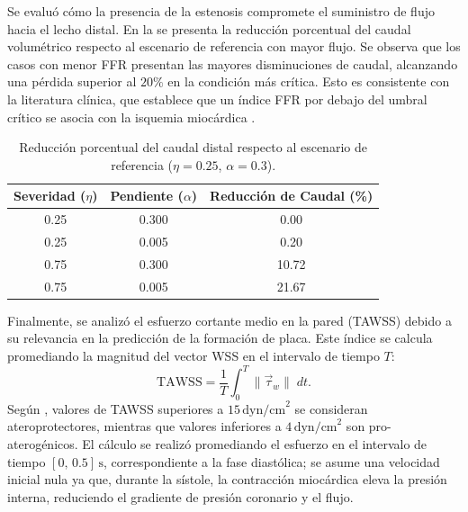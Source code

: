 \documentclass[12pt, letterpaper]{article}
\begin{document}
Se evaluó cómo la presencia de la estenosis compromete el suministro de flujo hacia el lecho distal. En la  se presenta la reducción porcentual del caudal volumétrico respecto al escenario de referencia con mayor flujo. Se observa que los casos con menor FFR presentan las mayores disminuciones de caudal, alcanzando una pérdida superior al $20\%$ en la condición más crítica. Esto es consistente con la literatura clínica, que establece que un índice FFR por debajo del umbral crítico se asocia con la isquemia miocárdica \cite{manual_ffr08}.

\begin{table}[htbp]
  \centering
  \caption{Reducción porcentual del caudal distal respecto al escenario de referencia ($\eta=0.25$, $\alpha=0.3$).}
  \label{tab:reduccion_caudal}
  \begin{tabular}{ccc}
    \toprule
    \textbf{Severidad ($\eta$)} & \textbf{Pendiente ($\alpha$)} & \textbf{Reducción de Caudal (\%)} \\ \midrule
    0.25 & 0.300 & 0.00 \\ 
    0.25 & 0.005 & 0.20 \\
    0.75 & 0.300 & 10.72 \\
    0.75 & 0.005 & 21.67 \\ \bottomrule
  \end{tabular}
\end{table}


Finalmente, se analizó el esfuerzo cortante medio en la pared (TAWSS) debido a su relevancia en la predicción de la formación de placa. Este índice se calcula promediando la magnitud del vector WSS en el intervalo de tiempo $T$:
\begin{equation}
    \label{eq:tawss_definition}
    \text{TAWSS} = \frac{1}{T} \int_{0}^{T} \|\vec{\tau}_w\| \; dt.
\end{equation}
Según \cite{hemo_wss}, valores de TAWSS superiores a $15\,\text{dyn/cm}^2$ se consideran ateroprotectores, mientras que valores inferiores a $4\,\text{dyn/cm}^2$ son pro-aterogénicos. El cálculo se realizó promediando el esfuerzo en el intervalo de tiempo $[0,\,0.5]\,\text{s}$, correspondiente a la fase diastólica; se asume una velocidad inicial nula ya que, durante la sístole, la contracción miocárdica eleva la presión interna, reduciendo el gradiente de presión coronario y el flujo.
\end{document}
